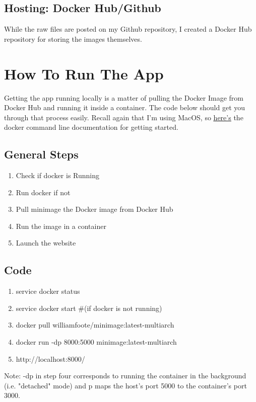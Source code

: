 \documentclass[10pt]{article}
\begin{document}
\begin{multicols*}{2}
\subsection{Hosting: Docker Hub/Github}

While the raw files are posted on my Github repository, I created a Docker Hub repository for storing the images themselves.

\section{How To Run The App}

Getting the app running locally is a matter of pulling the Docker Image from Docker Hub and running it inside a container. The code below should get you through that process easily. Recall again that I'm using MacOS, so \underline{\href{https://docs.docker.com/engine/reference/commandline/cli/}{here's}} the docker command line documentation for getting started.

\subsection{General Steps}

\begin{enumerate}
\item Check if docker is Running
\item Run docker if not
\item Pull minimage the Docker image from Docker Hub
\item Run the image in a container
\item Launch the website
\end{enumerate}

\subsection{Code}

\begin{enumerate}
\item service docker status
\item service docker start \#(if docker is not running)
\item docker pull williamfoote/minimage:latest-multiarch
\item docker run -dp 8000:5000 minimage:latest-multiarch
\item http://localhost:8000/
\end{enumerate}

Note: -dp in step four corresponds to running the container in the background (i.e. "detached" mode) and p maps the host's port 5000 to the container's port 3000.


\end{multicols*}
\end{document}
